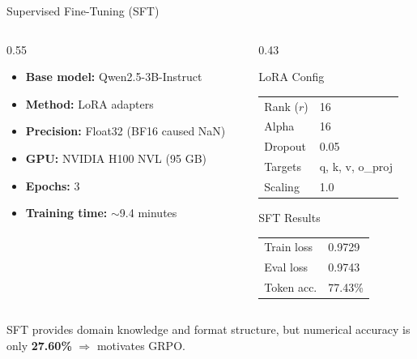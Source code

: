 \documentclass[10pt]{beamer}
\begin{document}
\begin{frame}{Supervised Fine-Tuning (SFT)}
\large
\begin{columns}[t]
    \begin{column}{0.55\linewidth}
        \begin{itemize}
            \item \textbf{Base model:} Qwen2.5-3B-Instruct
            \item \textbf{Method:} LoRA adapters
            \item \textbf{Precision:} Float32 (BF16 caused NaN)
            \item \textbf{GPU:} NVIDIA H100 NVL (95 GB)
            \item \textbf{Epochs:} 3
            \item \textbf{Training time:} $\sim$9.4 minutes
        \end{itemize}
    \end{column}
    \begin{column}{0.43\linewidth}
        \begin{block}{LoRA Config}
            \footnotesize
            \begin{tabular}{ll}
                Rank ($r$) & 16 \\
                Alpha & 16 \\
                Dropout & 0.05 \\
                Targets & q, k, v, o\_proj \\
                Scaling & 1.0 \\
            \end{tabular}
        \end{block}
        \vspace{0.2cm}
        \begin{block}{SFT Results}
            \footnotesize
            \begin{tabular}{ll}
                Train loss & 0.9729 \\
                Eval loss & 0.9743 \\
                Token acc. & 77.43\% \\
            \end{tabular}
        \end{block}
    \end{column}
\end{columns}

\vspace{0.3cm}
\centering
{\small SFT provides domain knowledge and format structure, but numerical accuracy is only \textbf{27.60\%} $\Rightarrow$ motivates GRPO.}
\end{frame}
\end{document}
